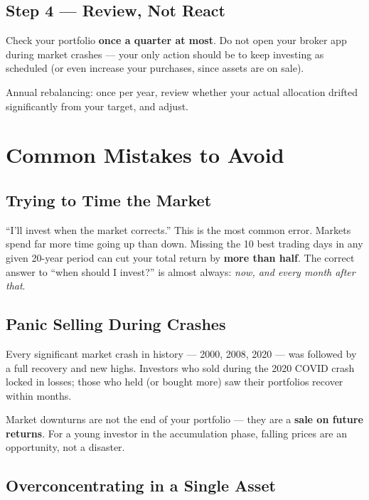 \documentclass[12pt, a4paper]{book}
\begin{document}
\section{Step 4 --- Review, Not React}

Check your portfolio \textbf{once a quarter at most}. Do not open your broker app during market crashes --- your only action should be to keep investing as scheduled (or even increase your purchases, since assets are on sale).

Annual rebalancing: once per year, review whether your actual allocation drifted significantly from your target, and adjust.

\chapter{Common Mistakes to Avoid}

\section{Trying to Time the Market}

``I'll invest when the market corrects.'' This is the most common error. Markets spend far more time going up than down. Missing the 10 best trading days in any given 20-year period can cut your total return by \textbf{more than half}. The correct answer to ``when should I invest?'' is almost always: \textit{now, and every month after that}.

\section{Panic Selling During Crashes}

Every significant market crash in history --- 2000, 2008, 2020 --- was followed by a full recovery and new highs. Investors who sold during the 2020 COVID crash locked in losses; those who held (or bought more) saw their portfolios recover within months.

\begin{keybox}
Market downturns are not the end of your portfolio --- they are a \textbf{sale on future returns}. For a young investor in the accumulation phase, falling prices are an opportunity, not a disaster.
\end{keybox}

\section{Overconcentrating in a Single Asset}
\end{document}
